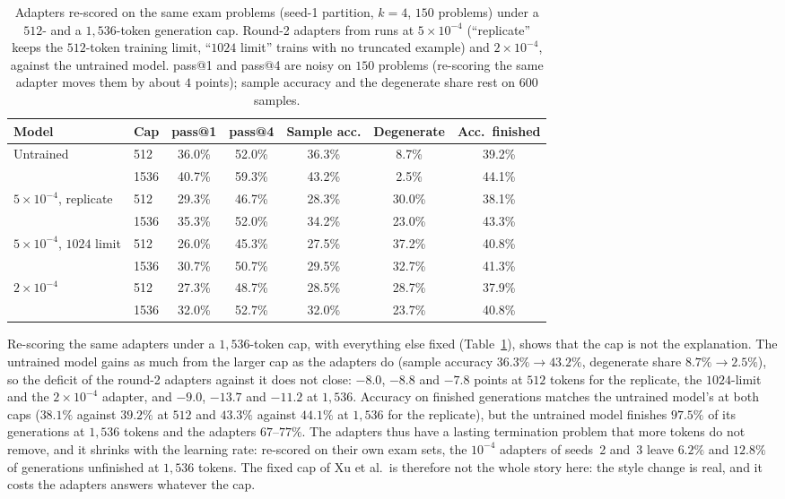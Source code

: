 \documentclass[runningheads]{llncs}
\begin{document}
\begin{table}[t]
\caption{Adapters re-scored on the same exam problems (seed-1 partition, $k=4$,
$150$ problems) under a $512$- and a $1{,}536$-token generation cap. Round-2
adapters from runs at $5\times10^{-4}$ (``replicate'' keeps the $512$-token
training limit, ``$1024$ limit'' trains with no truncated example) and
$2\times10^{-4}$, against the untrained model. pass@1 and pass@4 are noisy on
$150$ problems (re-scoring the same adapter moves them by about $4$ points);
sample accuracy and the degenerate share rest on $600$ samples.}
\label{tab:reeval}
\centering
\setlength{\tabcolsep}{4pt}
\begin{tabular}{llccccc}
\toprule
Model & Cap & pass@1 & pass@4 & Sample acc. & Degenerate & Acc.\ finished \\
\midrule
Untrained                & 512  & 36.0\% & 52.0\% & 36.3\% & 8.7\%  & 39.2\% \\
                         & 1536 & 40.7\% & 59.3\% & 43.2\% & 2.5\%  & 44.1\% \\
$5\times10^{-4}$, replicate & 512  & 29.3\% & 46.7\% & 28.3\% & 30.0\% & 38.1\% \\
                         & 1536 & 35.3\% & 52.0\% & 34.2\% & 23.0\% & 43.3\% \\
$5\times10^{-4}$, $1024$ limit & 512  & 26.0\% & 45.3\% & 27.5\% & 37.2\% & 40.8\% \\
                         & 1536 & 30.7\% & 50.7\% & 29.5\% & 32.7\% & 41.3\% \\
$2\times10^{-4}$         & 512  & 27.3\% & 48.7\% & 28.5\% & 28.7\% & 37.9\% \\
                         & 1536 & 32.0\% & 52.7\% & 32.0\% & 23.7\% & 40.8\% \\
\bottomrule
\end{tabular}
\end{table}

Re-scoring the same adapters under a $1{,}536$-token cap, with everything else
fixed (Table~\ref{tab:reeval}), shows that the cap is not the explanation. The
untrained model gains as much from the larger cap as the adapters do (sample
accuracy $36.3\%\to43.2\%$, degenerate share $8.7\%\to2.5\%$), so the deficit of
the round-2 adapters against it does not close: $-8.0$, $-8.8$ and $-7.8$ points
at $512$ tokens for the replicate, the $1024$-limit and the $2\times10^{-4}$
adapter, and $-9.0$, $-13.7$ and $-11.2$ at $1{,}536$. Accuracy on finished
generations matches the untrained model's at both caps ($38.1\%$ against $39.2\%$
at $512$ and $43.3\%$ against $44.1\%$ at $1{,}536$ for the replicate), but the
untrained model finishes $97.5\%$ of its generations at $1{,}536$ tokens and the
adapters $67$--$77\%$. The adapters thus have a lasting termination problem that
more tokens do not remove, and it shrinks with the learning rate: re-scored on
their own exam sets, the $10^{-4}$ adapters of seeds~2 and~3 leave $6.2\%$ and
$12.8\%$ of generations unfinished at $1{,}536$ tokens. The fixed cap of
Xu et al.\ is therefore not the whole story here: the style change is real, and
it costs the adapters answers whatever the cap.
\end{document}

